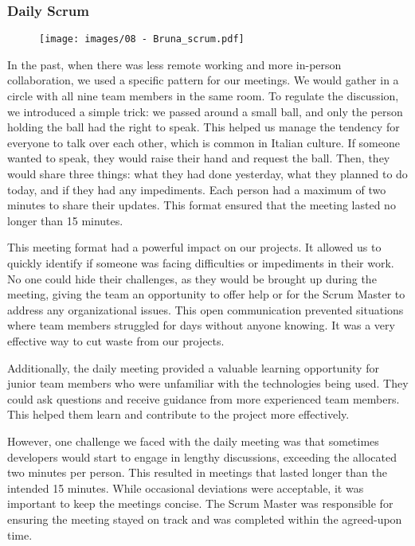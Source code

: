 \subsubsection{Daily Scrum}

\begin{figure}[!h]
    \centering
    \texttt{[image: images/08 - Bruna\_scrum.pdf]}
\end{figure}

In the past, when there was less remote working and more in-person
collaboration, we used a specific pattern for our meetings. We would
gather in a circle with all nine team members in the same room. To
regulate the discussion, we introduced a simple trick: we passed around
a small ball, and only the person holding the ball had the right to
speak. This helped us manage the tendency for everyone to talk over each
other, which is common in Italian culture. If someone wanted to speak,
they would raise their hand and request the ball. Then, they would share
three things: what they had done yesterday, what they planned to do
today, and if they had any impediments. Each person had a maximum of two
minutes to share their updates. This format ensured that the meeting
lasted no longer than 15 minutes.

This meeting format had a powerful impact on our projects. It allowed us
to quickly identify if someone was facing difficulties or impediments in
their work. No one could hide their challenges, as they would be brought
up during the meeting, giving the team an opportunity to offer help or
for the Scrum Master to address any organizational issues. This open
communication prevented situations where team members struggled for days
without anyone knowing. It was a very effective way to cut waste from
our projects.

Additionally, the daily meeting provided a valuable learning opportunity
for junior team members who were unfamiliar with the technologies being
used. They could ask questions and receive guidance from more
experienced team members. This helped them learn and contribute to the
project more effectively.

However, one challenge we faced with the daily meeting was that
sometimes developers would start to engage in lengthy discussions,
exceeding the allocated two minutes per person. This resulted in
meetings that lasted longer than the intended 15 minutes. While
occasional deviations were acceptable, it was important to keep the
meetings concise. The Scrum Master was responsible for ensuring the
meeting stayed on track and was completed within the agreed-upon time.

